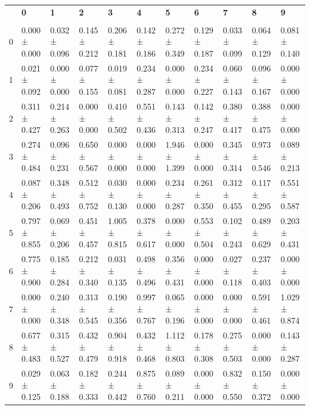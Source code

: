 \begingroup
\scriptsize
\setlength{\tabcolsep}{3pt}
\begin{tabular}{lllllllllll}
\toprule
 & \textbf{0} & \textbf{1} & \textbf{2} & \textbf{3} & \textbf{4} & \textbf{5} & \textbf{6} & \textbf{7} & \textbf{8} & \textbf{9} \\
  &  &  &  &  &  &  &  &  &  &  \\
\midrule
0 & 0.000 ± 0.000 & 0.032 ± 0.096 & 0.145 ± 0.212 & 0.206 ± 0.181 & 0.142 ± 0.186 & 0.272 ± 0.349 & 0.129 ± 0.187 & 0.033 ± 0.099 & 0.064 ± 0.129 & 0.081 ± 0.140 \\
1 & 0.021 ± 0.092 & 0.000 ± 0.000 & 0.077 ± 0.155 & 0.019 ± 0.081 & 0.234 ± 0.287 & 0.000 ± 0.000 & 0.234 ± 0.227 & 0.060 ± 0.143 & 0.096 ± 0.167 & 0.000 ± 0.000 \\
2 & 0.311 ± 0.427 & 0.214 ± 0.263 & 0.000 ± 0.000 & 0.410 ± 0.502 & 0.551 ± 0.436 & 0.143 ± 0.313 & 0.142 ± 0.247 & 0.380 ± 0.417 & 0.388 ± 0.475 & 0.000 ± 0.000 \\
3 & 0.274 ± 0.484 & 0.096 ± 0.231 & 0.650 ± 0.567 & 0.000 ± 0.000 & 0.000 ± 0.000 & 1.946 ± 1.399 & 0.000 ± 0.000 & 0.345 ± 0.314 & 0.973 ± 0.546 & 0.089 ± 0.213 \\
4 & 0.087 ± 0.206 & 0.348 ± 0.493 & 0.512 ± 0.752 & 0.030 ± 0.130 & 0.000 ± 0.000 & 0.234 ± 0.287 & 0.261 ± 0.350 & 0.312 ± 0.455 & 0.117 ± 0.295 & 0.551 ± 0.587 \\
5 & 0.797 ± 0.855 & 0.069 ± 0.206 & 0.451 ± 0.457 & 1.005 ± 0.815 & 0.378 ± 0.617 & 0.000 ± 0.000 & 0.553 ± 0.504 & 0.102 ± 0.243 & 0.489 ± 0.629 & 0.203 ± 0.431 \\
6 & 0.775 ± 0.900 & 0.185 ± 0.284 & 0.212 ± 0.340 & 0.031 ± 0.135 & 0.498 ± 0.496 & 0.356 ± 0.431 & 0.000 ± 0.000 & 0.027 ± 0.118 & 0.237 ± 0.403 & 0.000 ± 0.000 \\
7 & 0.000 ± 0.000 & 0.240 ± 0.348 & 0.313 ± 0.545 & 0.190 ± 0.356 & 0.997 ± 0.767 & 0.065 ± 0.196 & 0.000 ± 0.000 & 0.000 ± 0.000 & 0.591 ± 0.461 & 1.029 ± 0.874 \\
8 & 0.677 ± 0.483 & 0.315 ± 0.527 & 0.432 ± 0.479 & 0.904 ± 0.918 & 0.432 ± 0.468 & 1.112 ± 0.803 & 0.178 ± 0.308 & 0.275 ± 0.503 & 0.000 ± 0.000 & 0.143 ± 0.287 \\
9 & 0.029 ± 0.125 & 0.063 ± 0.188 & 0.182 ± 0.333 & 0.244 ± 0.442 & 0.875 ± 0.760 & 0.089 ± 0.211 & 0.000 ± 0.000 & 0.832 ± 0.550 & 0.150 ± 0.372 & 0.000 ± 0.000 \\
\bottomrule
\end{tabular}

\endgroup
